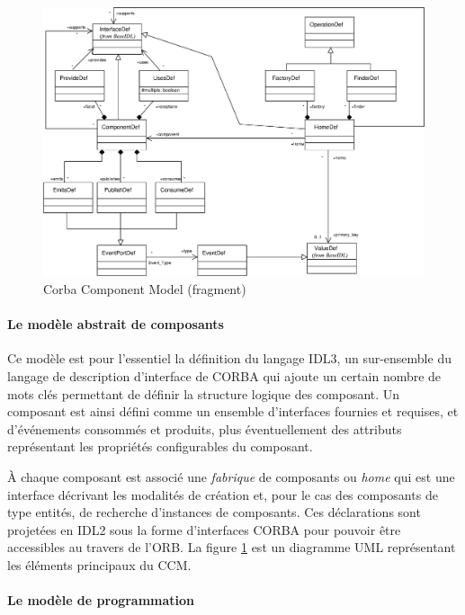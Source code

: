 \begin{figure}[htbp]
    \centering
    \includegraphics[width=\textwidth]{figures/fig-ccm-model.eps}
    \caption{Corba Component Model (fragment)}
    \label{fig-ccm-model}
\end{figure}

\paragraph{Le mod\`ele abstrait de composants}

Ce mod\`ele est pour l'essentiel la d\'efinition du langage \textsf{IDL3}, un
sur-ensemble du langage de description d'interface de \textsf{CORBA} qui ajoute
un certain nombre de mots cl\'es  permettant de d\'efinir la
structure logique des composant. Un composant est ainsi d\'efini
comme un ensemble d'interfaces fournies et requises, et
d'\'ev\'enements consomm\'es et produits, plus \'eventuellement
des attributs repr\'esentant les
propri\'et\'es configurables du composant. 

\`A chaque composant est
associ\'e une \emph{fabrique} de composants ou \emph{home} qui
est une interface d\'ecrivant les modalit\'es de cr\'eation et,
pour le cas des composants de type entit\'es, de recherche
d'instances de composants.
 Ces d\'eclarations sont projet\'ees en \textsf{IDL2} sous la forme 
d'interfaces \textsf{CORBA} pour pouvoir \^etre accessibles au
travers de l'\textsf{ORB}.
La figure \ref{fig-ccm-model} est un diagramme \textsf{UML}
repr\'esentant les \'el\'ements principaux du \textsf{CCM}.

 \paragraph{Le mod\`ele de programmation}

